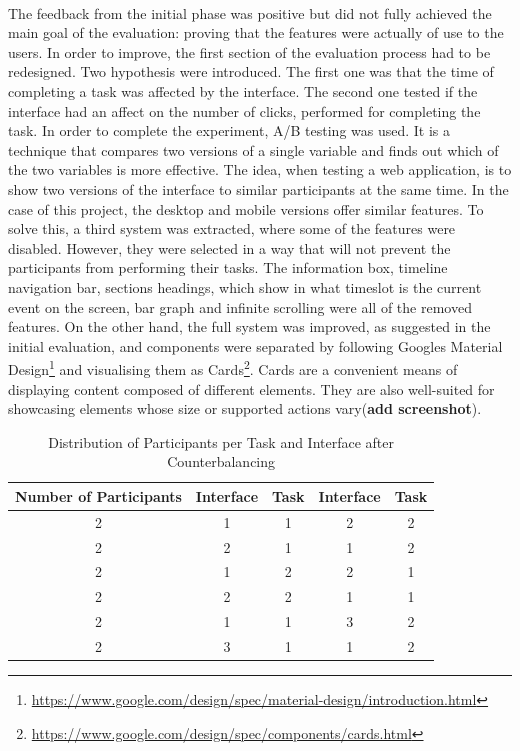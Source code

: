 \documentclass{l4proj}
\begin{document}
\paragraph{}
The feedback from the initial phase was positive but did not fully achieved the main goal of the evaluation: proving that the features were actually of use to the users. In order to improve, the first section of the evaluation process had to be redesigned. Two hypothesis were introduced. The first one was that the time of completing a task was affected by the interface. The second one tested if the interface had an affect on the number of clicks, performed for completing the task. In order to complete the experiment, A/B testing was used. It is a technique that compares two versions of a single variable and finds out which of the two variables is more effective. The idea, when testing a web application, is to show two versions of the interface to similar participants at the same time. In the case of this project, the desktop and mobile versions offer similar features. To solve this, a third system was extracted, where some of the features were disabled. However, they were selected in a way that will not prevent the participants from performing their tasks. The information box, timeline navigation bar, sections headings, which show in what timeslot is the current event on the screen, bar graph and infinite scrolling were all of the removed features. On the other hand, the full system was improved, as suggested in the initial evaluation, and components were separated by following Google\textquotesingle s Material Design\footnote{\url{https://www.google.com/design/spec/material-design/introduction.html}} and visualising them as Cards\footnote{\url{https://www.google.com/design/spec/components/cards.html}}. Cards are a convenient means of displaying content composed of different elements. They are also well-suited for showcasing elements whose size or supported actions vary(\textbf{add screenshot}).

\begin{table}[H]
	\centering
	\begin{tabular}{|c|c|c|c|c|} \hline
		Number of Participants&	Interface & Task &	Interface & Task \\ \hline
		2 	& 1	& 1	& 2 & 2  \\ \hline
		2	& 2	& 1	& 1 & 2  \\ \hline
		2 	& 1	& 2	& 2 & 1  \\ \hline
		2	& 2	& 2 & 1 & 1  \\ \hline
		2 	& 1	& 1	& 3 & 2  \\ \hline
		2	& 3	& 1	& 1 & 2  \\ \hline
	\end{tabular}
	\caption{Distribution of Participants per Task and Interface after Counterbalancing}
	\label{tab:counterbalancing}
\end{table}
\end{document}
